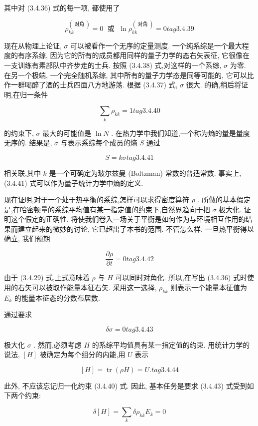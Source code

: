 其中对 (3.4.36) 式的每一项, 都使用了

$$
{\rho }_{kk}^{\left( \text{ 对角 }\right) } = 0\;\text{ 或 }\;\ln {\rho }_{kk}^{\left( \text{ 对角 }\right) } = 0 tag{3. 4.39}
$$

现在从物理上论证, $\sigma$ 可以被看作一个无序的定量测度. 一个纯系综是一个最大程度的有序系综, 因为它的所有的成员都用同样的量子力学的态右矢表征, 它很像在一支训练有素部队中齐步走的士兵. 按照 (3.4.38) 式,对这样的一个系综, $\sigma$ 为零. 在另一个极端, 一个完全随机系综, 其中所有的量子力学态是同等可能的, 它可以比作一群喝醉了酒的士兵四面八方地游荡. 根据 (3.4.37) 式, $\sigma$ 很大. 的确,稍后将证明,在归一条件

$$
\mathop{\sum }\limits_{k}{\rho }_{kk} = 1 tag{3.4.40}
$$

的约束下, $\sigma$ 最大的可能值是 $\ln N$ . 在热力学中我们知道,一个称为熵的量是量度无序的. 结果是, $\sigma$ 与表示系综每个成员的熵 $S$ 通过

$$
S = {k\sigma } tag{3. 4.41}
$$

相关联,其中 $k$ 是一个可确定为玻尔兹曼 (Boltzman) 常数的普适常数. 事实上, (3.4.41) 式可以作为量子统计力学中熵的定义.

现在证明,对于一个处于热平衡的系综,怎样可以求得密度算符 $\rho$ . 所做的基本假定是,在哈密顿量的系综平均值有某一指定值的约束下,自然界趋向于把 $\sigma$ 极大化. 证明这个假定的正确性, 将使我们卷入一场关于平衡是如何作为与环境相互作用的结果而建立起来的微妙的讨论, 它已超出了本书的范围. 不管怎么样, 一旦热平衡得以确立, 我们预期

$$
\frac{\partial \rho }{\partial t} = 0 tag{3. 4.42}
$$

由于 (3.4.29) 式,上式意味着 $\rho$ 与 $H$ 可以同时对角化. 所以,在写出 (3.4.36) 式时使用的右矢可以被取作能量本征右矢. 采用这一选择, ${\rho }_{kk}$ 则表示一个能量本征值为 ${E}_{k}$ 的能量本征态的分数布居数.

通过要求

$$
{\delta \sigma } = 0 tag{3. 4.43}
$$

极大化 $\sigma$ . 然而,必须考虑 $H$ 的系综平均值具有某一指定值的约束. 用统计力学的说法, $\left\lbrack H\right\rbrack$ 被确定为每个组分的内能,用 $U$ 表示

$$
\left\lbrack H\right\rbrack = \operatorname{tr}\left( {\rho H}\right) = U. tag{3. 4.44}
$$

此外, 不应该忘记归一化约束 (3.4.40) 式. 因此, 基本任务是要求 (3.4.43) 式受到如下两个约束:

$$
\delta \left\lbrack H\right\rbrack = \mathop{\sum }\limits_{k}\delta {\rho }_{kk}{E}_{k} = 0
$$


